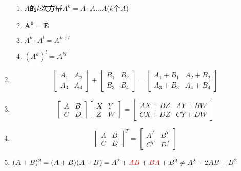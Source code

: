 \documentclass[a4paper,12pt]{article}
\begin{document}
\begin{enumerate}
        \begin{enumerate}
            \item $A$的$k$次方幂$A^k = A \cdot A \dots A$($k$个$A$)
            \item $\mathbf{A^0 = E}$
            \item $A^k \cdot A^l = A^{k+l}$
            \item $(A^k)^l = A^{kl}$
        \end{enumerate}
        \item
        \[
            \begin{bmatrix}
                A_1 & A_2 \\
                A_3 & A_4
            \end{bmatrix}
            + \begin{bmatrix}
                  B_1 & B_2 \\
                  B_3 & B_4
            \end{bmatrix}
            = \begin{bmatrix}
                  A_1 + B_1 & A_2 + B_2 \\
                  A_3 + B_3 & A_4 + B_4
            \end{bmatrix}
        \]
        \item
        \[
            \begin{bmatrix}
                A & B \\
                C & D
            \end{bmatrix}
            \begin{bmatrix}
                X & Y \\
                Z & W
            \end{bmatrix}
            = \begin{bmatrix}
                  AX + BZ & AY + BW \\
                  CX + DZ & CY + DW
            \end{bmatrix}
        \]
        \item
        \[
            \begin{bmatrix}
                A & B \\
                C & D
            \end{bmatrix}^{T}
            = \begin{bmatrix}
                  A^T & B^T \\
                  C^T & D^T
            \end{bmatrix}
        \]
        \item $(A + B)^2 = (A + B)(A + B) = A^2 + {\color{red}{AB}} + {\color{red}{BA}} + B^2 \;\mathbf{\neq}\; A^2 + 2AB + B^2$

\end{enumerate}
\end{document}
